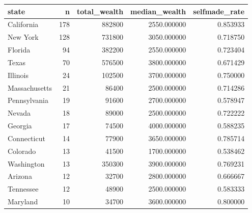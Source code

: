 \begin{tabular}{lrrrr}
\toprule
state & n & total\_wealth & median\_wealth & selfmade\_rate \\
\midrule
California & 178 & 882800 & 2550.000000 & 0.853933 \\
New York & 128 & 731800 & 3050.000000 & 0.718750 \\
Florida & 94 & 382200 & 2550.000000 & 0.723404 \\
Texas & 70 & 576500 & 3800.000000 & 0.671429 \\
Illinois & 24 & 102500 & 3700.000000 & 0.750000 \\
Massachusetts & 21 & 86400 & 2500.000000 & 0.714286 \\
Pennsylvania & 19 & 91600 & 2700.000000 & 0.578947 \\
Nevada & 18 & 89000 & 2500.000000 & 0.722222 \\
Georgia & 17 & 74500 & 4000.000000 & 0.588235 \\
Connecticut & 14 & 77900 & 3650.000000 & 0.785714 \\
Colorado & 13 & 41500 & 1700.000000 & 0.538462 \\
Washington & 13 & 350300 & 3900.000000 & 0.769231 \\
Arizona & 12 & 32700 & 2800.000000 & 0.666667 \\
Tennessee & 12 & 48900 & 2500.000000 & 0.583333 \\
Maryland & 10 & 34700 & 3600.000000 & 0.800000 \\
\bottomrule
\end{tabular}
